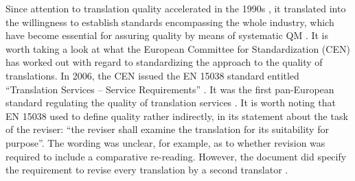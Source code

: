 \documentclass[output=paper]{langsci/langscibook}
\begin{document}
Since attention to translation quality accelerated in the 1990s \citep[15]{PrietoRamos2015}, it translated into the willingness to establish standards encompassing the whole industry, which have become essential for assuring quality by means of systematic QM \citep[170]{Lušicky2017}. It is worth taking a look at what the European Committee for Standardization (CEN) has worked out with regard to standardizing the approach to the quality of translations. In 2006, the CEN issued the EN 15038 standard entitled “Translation Services – Service Requirements” \citep[131]{Mossop2014}. It was the first pan-European standard regulating the quality of translation services \citep[16]{Biel2011a}. It is worth noting that EN 15038 used to define quality rather indirectly, in its statement about the task of the reviser: “the reviser shall examine the translation for its suitability for purpose”. The wording was unclear, for example, as to whether revision was required to include a comparative re-reading. However, the document did specify the requirement to revise every translation by a second translator \citep{Biel2011b}.
\end{document}
